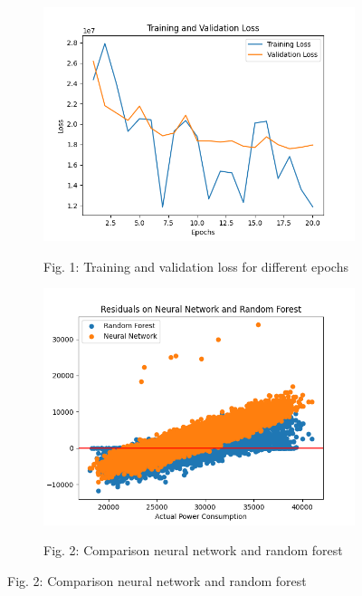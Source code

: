 \documentclass[a4, 10 pt, conference]{ieeeconf}  %
\begin{document}
\begin{figure}
  \centering
  \begin{subfigure}[b]{0.5\textwidth}
    \centering
    \includegraphics[width=\textwidth]{media/epochs.png}
    \label{fig:graphic1}
    \caption*{Fig. 1: Training and validation loss for different epochs}
  \end{subfigure}%
  \begin{subfigure}[b]{0.5\textwidth}
    \centering
    \includegraphics[width=\textwidth]{media/comparison_rf_nn.png}
    \label{fig:graphic2}
    \caption*{Fig. 2: Comparison neural network and random forest}
  \end{subfigure}
  \label{fig:graphics}
\end{figure}
\end{document}
